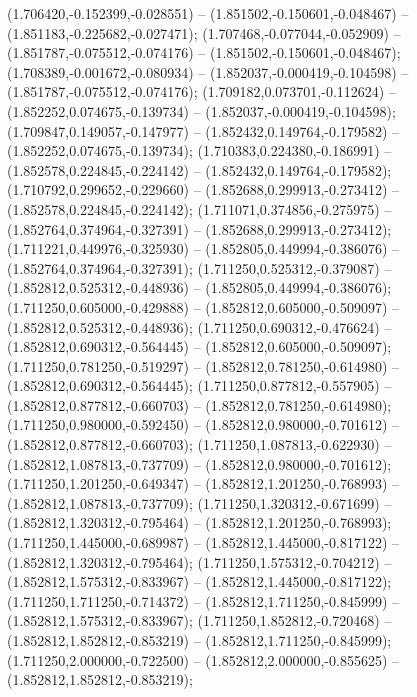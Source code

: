  (1.706420,-0.152399,-0.028551) -- (1.851502,-0.150601,-0.048467) -- (1.851183,-0.225682,-0.027471);
 (1.707468,-0.077044,-0.052909) -- (1.851787,-0.075512,-0.074176) -- (1.851502,-0.150601,-0.048467);
 (1.708389,-0.001672,-0.080934) -- (1.852037,-0.000419,-0.104598) -- (1.851787,-0.075512,-0.074176);
 (1.709182,0.073701,-0.112624) -- (1.852252,0.074675,-0.139734) -- (1.852037,-0.000419,-0.104598);
 (1.709847,0.149057,-0.147977) -- (1.852432,0.149764,-0.179582) -- (1.852252,0.074675,-0.139734);
 (1.710383,0.224380,-0.186991) -- (1.852578,0.224845,-0.224142) -- (1.852432,0.149764,-0.179582);
 (1.710792,0.299652,-0.229660) -- (1.852688,0.299913,-0.273412) -- (1.852578,0.224845,-0.224142);
 (1.711071,0.374856,-0.275975) -- (1.852764,0.374964,-0.327391) -- (1.852688,0.299913,-0.273412);
 (1.711221,0.449976,-0.325930) -- (1.852805,0.449994,-0.386076) -- (1.852764,0.374964,-0.327391);
 (1.711250,0.525312,-0.379087) -- (1.852812,0.525312,-0.448936) -- (1.852805,0.449994,-0.386076);
 (1.711250,0.605000,-0.429888) -- (1.852812,0.605000,-0.509097) -- (1.852812,0.525312,-0.448936);
 (1.711250,0.690312,-0.476624) -- (1.852812,0.690312,-0.564445) -- (1.852812,0.605000,-0.509097);
 (1.711250,0.781250,-0.519297) -- (1.852812,0.781250,-0.614980) -- (1.852812,0.690312,-0.564445);
 (1.711250,0.877812,-0.557905) -- (1.852812,0.877812,-0.660703) -- (1.852812,0.781250,-0.614980);
 (1.711250,0.980000,-0.592450) -- (1.852812,0.980000,-0.701612) -- (1.852812,0.877812,-0.660703);
 (1.711250,1.087813,-0.622930) -- (1.852812,1.087813,-0.737709) -- (1.852812,0.980000,-0.701612);
 (1.711250,1.201250,-0.649347) -- (1.852812,1.201250,-0.768993) -- (1.852812,1.087813,-0.737709);
 (1.711250,1.320312,-0.671699) -- (1.852812,1.320312,-0.795464) -- (1.852812,1.201250,-0.768993);
 (1.711250,1.445000,-0.689987) -- (1.852812,1.445000,-0.817122) -- (1.852812,1.320312,-0.795464);
 (1.711250,1.575312,-0.704212) -- (1.852812,1.575312,-0.833967) -- (1.852812,1.445000,-0.817122);
 (1.711250,1.711250,-0.714372) -- (1.852812,1.711250,-0.845999) -- (1.852812,1.575312,-0.833967);
 (1.711250,1.852812,-0.720468) -- (1.852812,1.852812,-0.853219) -- (1.852812,1.711250,-0.845999);
 (1.711250,2.000000,-0.722500) -- (1.852812,2.000000,-0.855625) -- (1.852812,1.852812,-0.853219);
